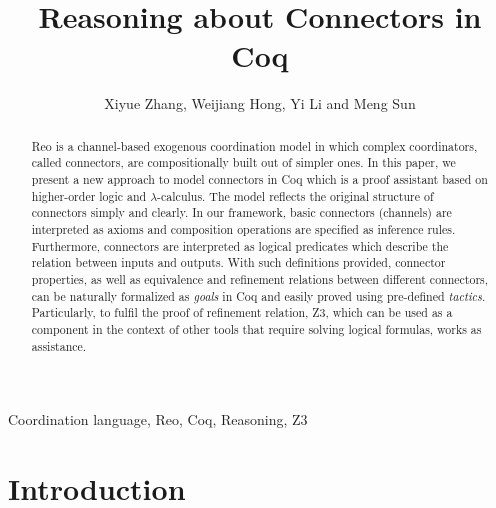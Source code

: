 \documentclass[3p,times]{elsarticle}
\begin{document}
\begin{frontmatter}

\title{Reasoning about Connectors in Coq}


\author{Xiyue Zhang, Weijiang Hong, Yi Li and Meng Sun}


\address{Department of Informatics and LMAM, School of Mathematical Sciences,\\ Peking University}

\begin{abstract}
Reo is a channel-based exogenous coordination model in which complex coordinators, called connectors, are compositionally
built out of simpler ones. In this paper, we present a new approach to model connectors in Coq which is a proof assistant based on higher-order logic and $\lambda$-calculus.
The model reflects the original structure of connectors simply and clearly. In our framework, basic connectors (channels) are interpreted as axioms and composition operations are specified as inference rules. Furthermore, connectors are interpreted as logical predicates which describe the relation
between inputs and outputs. With such definitions provided, connector properties, as well as equivalence and refinement relations between different connectors, can be naturally formalized as \emph{goals} in Coq and easily proved using pre-defined \emph{tactics}. Particularly, to fulfil the proof of refinement relation, Z3, which can be used as a component in the context of other tools that require solving logical formulas, works as assistance.

\end{abstract}
\begin{keyword}
Coordination language, Reo, Coq, Reasoning, Z3
\end{keyword}
\end{frontmatter}
\section{Introduction}\label{sec:introduction}
\end{document}

